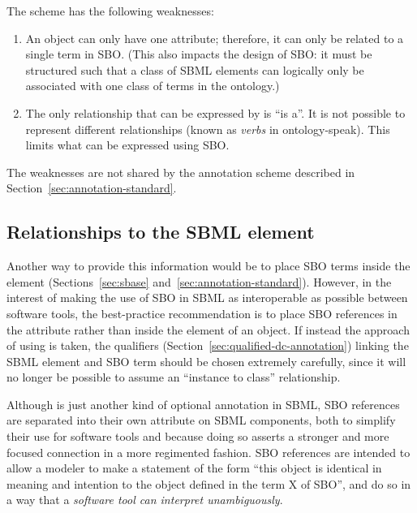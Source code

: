 The scheme has the following weaknesses:
\begin{enumerate}

\item An object can only have one  attribute;
  therefore, it can only be related to a single term in SBO.
  (This also impacts the design of SBO: it must be structured such
  that a class of SBML elements can logically only be associated
  with one class of terms in the ontology.)

\item The only relationship that can be expressed by
   is ``is a''.  It is not possible to represent
  different relationships (known as \emph{verbs} in
  ontology-speak).  This limits what can be expressed using SBO.

\end{enumerate}



The weaknesses are not shared by the annotation scheme described
in Section~\ref{sec:annotation-standard}.  



\subsection{Relationships to the SBML  element}

Another way to provide this information would be to place SBO
terms inside the \SBase {} element
(Sections~\ref{sec:sbase} and~\ref{sec:annotation-standard}).
However, in the interest of making the use of SBO in SBML as
interoperable as possible between software tools, the
best-practice recommendation is to place SBO references in the
 attribute rather than inside the
 element of an object. If instead the approach
of using  is taken, the qualifiers
(Section~\ref{sec:qualified-dc-annotation}) linking the SBML
element and SBO term should be chosen extremely carefully, since
it will no longer be possible to assume an ``instance to class''
relationship.

Although  is just another kind of optional
annotation in SBML, SBO references are separated into
their own attribute on SBML components, both to simplify their use
for software tools and because doing so asserts a stronger and
more focused connection in a more regimented fashion.  SBO
references are intended to allow a modeler to make a statement of
the form ``this object is identical in meaning and intention to
the object defined in the term X of SBO'', and do so in a way
that a \emph{software tool can interpret unambiguously}.


